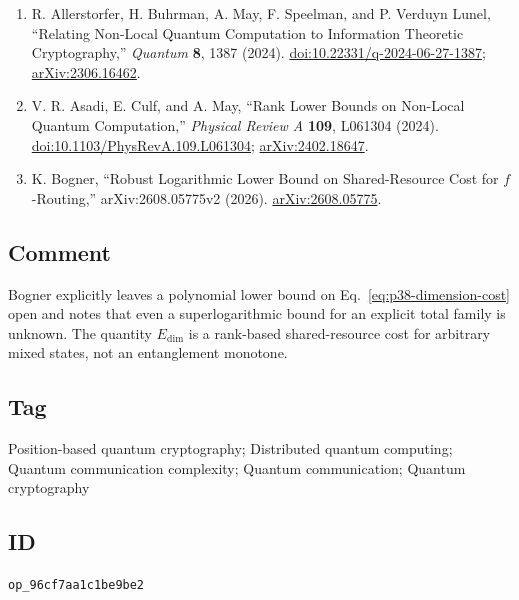 \begin{enumerate}[label={},leftmargin=4.8em,labelsep=0.5em]
  \footnotesize
  \item[\textup{[ABM+24]}]\label{ref:p38-allerstorfer}
  R. Allerstorfer, H. Buhrman, A. May, F. Speelman, and P. Verduyn Lunel,
  ``Relating Non-Local Quantum Computation to Information Theoretic
  Cryptography,'' \emph{Quantum} \textbf{8}, 1387 (2024).
  \href{https://doi.org/10.22331/q-2024-06-27-1387}%
       {doi:10.22331/q-2024-06-27-1387};
  \href{https://arxiv.org/abs/2306.16462}{arXiv:2306.16462}.

  \item[\textup{[ACM24]}]\label{ref:p38-asadi}
  V. R. Asadi, E. Culf, and A. May, ``Rank Lower Bounds on Non-Local Quantum
  Computation,'' \emph{Physical Review A} \textbf{109}, L061304 (2024).
  \href{https://doi.org/10.1103/PhysRevA.109.L061304}%
       {doi:10.1103/PhysRevA.109.L061304};
  \href{https://arxiv.org/abs/2402.18647}{arXiv:2402.18647}.

  \item[\textup{[Bog26]}]\label{ref:p38-bogner}
  K. Bogner, ``Robust Logarithmic Lower Bound on Shared-Resource Cost for
  $f$-Routing,'' arXiv:2608.05775v2 (2026).\newline
  \href{https://arxiv.org/abs/2608.05775}{arXiv:2608.05775}.
\end{enumerate}

\subsection*{Comment}

Bogner explicitly leaves a polynomial lower bound on
Eq.~\eqref{eq:p38-dimension-cost} open and notes that even a superlogarithmic
bound for an explicit total family is unknown.  The quantity
$E_{\mathrm{dim}}$ is a rank-based shared-resource cost for arbitrary mixed
states, not an entanglement monotone.

\subsection*{Tag}

Position-based quantum cryptography; Distributed quantum computing;
Quantum communication complexity; Quantum communication; Quantum cryptography

\subsection*{ID}

\texttt{op\_96cf7aa1c1be9be2}
